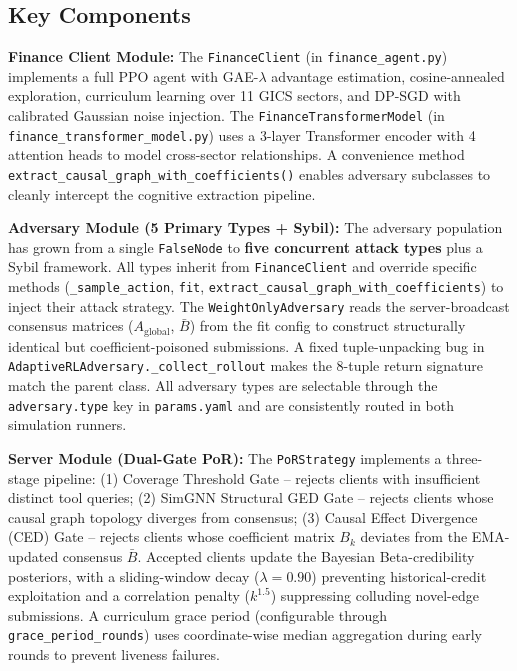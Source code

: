 \documentclass[journal]{IEEEtran}
\begin{document}
\subsection{Key Components}

\textbf{Finance Client Module:}
The \texttt{FinanceClient} (in \texttt{finance\_agent.py}) implements a full PPO agent with GAE-$\lambda$ advantage estimation, cosine-annealed exploration, curriculum learning over 11 GICS sectors, and DP-SGD with calibrated Gaussian noise injection. The \texttt{FinanceTransformerModel} (in \texttt{finance\_transformer\_model.py}) uses a 3-layer Transformer encoder with 4 attention heads to model cross-sector relationships. A convenience method \texttt{extract\_causal\_graph\_with\_coefficients()} enables adversary subclasses to cleanly intercept the cognitive extraction pipeline.

\textbf{Adversary Module (5 Primary Types + Sybil):}
The adversary population has grown from a single \texttt{FalseNode} to \textbf{five concurrent attack types} plus a Sybil framework. All types inherit from \texttt{FinanceClient} and override specific methods (\texttt{\_sample\_action}, \texttt{fit}, \texttt{extract\_causal\_graph\_with\_coefficients}) to inject their attack strategy. The \texttt{WeightOnlyAdversary} reads the server-broadcast consensus matrices ($A_{\text{global}}$, $\bar{B}$) from the fit config to construct structurally identical but coefficient-poisoned submissions. A fixed tuple-unpacking bug in \texttt{AdaptiveRLAdversary.\_collect\_rollout} makes the 8-tuple return signature match the parent class. All adversary types are selectable through the \texttt{adversary.type} key in \texttt{params.yaml} and are consistently routed in both simulation runners.

\textbf{Server Module (Dual-Gate PoR):}
The \texttt{PoRStrategy} implements a three-stage pipeline: (1) Coverage Threshold Gate -- rejects clients with insufficient distinct tool queries; (2) SimGNN Structural GED Gate -- rejects clients whose causal graph topology diverges from consensus; (3) Causal Effect Divergence (CED) Gate -- rejects clients whose coefficient matrix $B_k$ deviates from the EMA-updated consensus $\bar{B}$. Accepted clients update the Bayesian Beta-credibility posteriors, with a sliding-window decay ($\lambda=0.90$) preventing historical-credit exploitation and a correlation penalty ($k^{1.5}$) suppressing colluding novel-edge submissions. A curriculum grace period (configurable through \texttt{grace\_period\_rounds}) uses coordinate-wise median aggregation during early rounds to prevent liveness failures.
\end{document}
